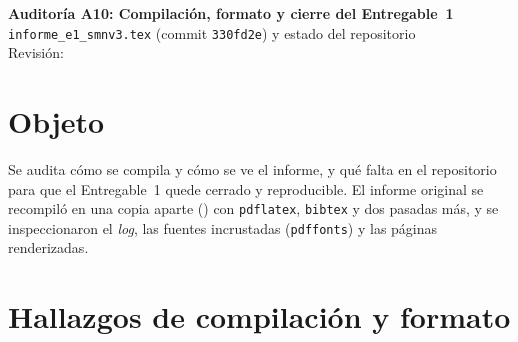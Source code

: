 \newcommand{\auditoriaid}{A10 -- Compilación, formato y cierre}



\begin{center}
{\Large\bfseries Auditoría A10: Compilación, formato y cierre del Entregable~1}\\[0.4em]
{\normalsize \texttt{informe\_e1\_smnv3.tex} (commit \texttt{330fd2e}) y estado del repositorio}\\[0.2em]
{\small Revisión: \fechaentrega}
\end{center}

\section{Objeto}

Se audita cómo se compila y cómo se ve el informe, y qué falta en el repositorio para que el Entregable~1 quede cerrado y reproducible. El informe original se recompiló en una copia aparte () con \texttt{pdflatex}, \texttt{bibtex} y dos pasadas más, y se inspeccionaron el \emph{log}, las fuentes incrustadas (\texttt{pdffonts}) y las páginas renderizadas.

\section{Hallazgos de compilación y formato}

